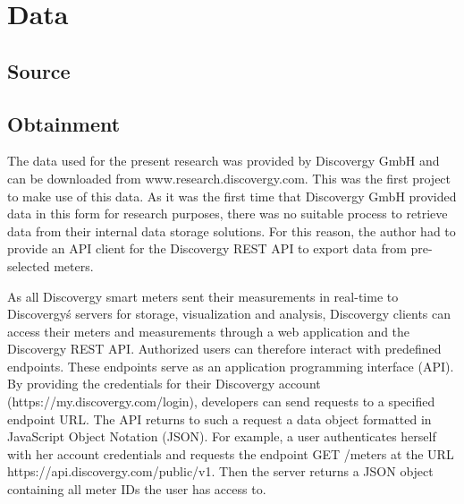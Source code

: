 
\section{Data}\label{Sec:Data}




\subsection{Source}\label{Sec:Data;Subsec:Source}




\subsection{Obtainment}\label{Sec:Data;Subsec:Obtainment}

The data used for the present research was provided by Discovergy GmbH and can be downloaded from www.research.discovergy.com. This was the first project to make use of this data. As it was the first time that Discovergy GmbH provided data in this form for research purposes, there was no suitable process to retrieve data from their internal data storage solutions. For this reason, the author had to provide an API client for the Discovergy REST API to export data from pre-selected meters.

As all Discovergy smart meters sent their measurements in real-time to Discovergy\'s servers for storage, visualization and analysis, Discovergy clients can access their meters and measurements through a web application and the Discovergy REST API. Authorized users can therefore interact with predefined endpoints. These endpoints serve as an application programming interface (API). By providing the credentials for their Discovergy account (https://my.discovergy.com/login), developers can send requests to a specified endpoint URL. The API returns to such a request a data object formatted in JavaScript Object Notation (JSON). For example, a user authenticates herself with her account credentials and requests the endpoint GET /meters at the URL https://api.discovergy.com/public/v1. Then the server returns a JSON object containing all meter IDs the user has access to.

